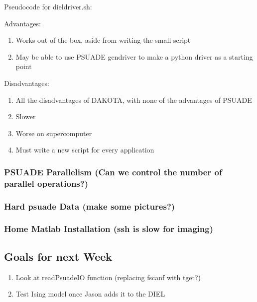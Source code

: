\documentclass[11pt]{article} %
\begin{document}
Pseudocode for dieldriver.sh:


Advantages:
\begin{enumerate}
	\item Works out of the box, aside from writing the small script
	\item May be able to use PSUADE gendriver to make a python driver as a starting point
\end{enumerate}
Disadvantages:
\begin{enumerate}
	\item All the disadvantages of DAKOTA, with none of the advantages of PSUADE
	\item Slower
	\item Worse on supercomputer
	\item Must write a new script for every application
\end{enumerate}



\subsubsection{PSUADE Parallelism (Can we control the number of parallel operations?)}

\subsubsection{Hard psuade Data (make some pictures?)}

\subsubsection{Home Matlab Installation (ssh is slow for imaging)}



\subsection{Goals for next Week}
\begin{enumerate}
	\item Look at readPsuadeIO function (replacing fscanf with tget?)
	\item Test Ising model once Jason adds it to the DIEL
\end{enumerate}
\end{document}
